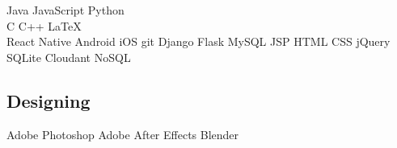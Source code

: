 \documentclass[letterpaper]{deedy-resume} %
\begin{document}
\begin{minipage}[t]{0.33\textwidth}
Java \textbullet{} JavaScript \textbullet{} Python\\
C \textbullet{} C++ \textbullet{} \LaTeX\ \\
React Native \textbullet{} Android \textbullet{} iOS \textbullet{} git \textbullet{} Django \textbullet{} Flask \textbullet{} MySQL \textbullet{} JSP \textbullet{} HTML \textbullet{} CSS \textbullet{} jQuery \textbullet{} SQLite \textbullet{} Cloudant NoSQL

\sectionspace %

\subsection{Designing}
Adobe Photoshop \textbullet{} Adobe After Effects \textbullet{} Blender

\sectionspace %


\end{minipage} %
\hfill
%
%
\end{document}
